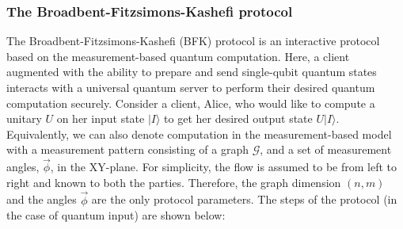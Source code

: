 \subsubsection{The Broadbent-Fitzsimons-Kashefi protocol}
\label{sec:bfk}
The Broadbent-Fitzsimons-Kashefi (BFK) protocol is an interactive protocol based on the measurement-based quantum computation. Here, a client augmented with the ability to prepare and send single-qubit quantum states interacts with a universal quantum server to perform their desired quantum computation securely.  Consider a client, Alice, who would like to compute a unitary $U$ on her input state $|I\rangle$ to get her desired output state $U |I\rangle$.  Equivalently, we can also denote computation in the measurement-based model with a measurement pattern consisting of a graph $\mathcal{G}$, and a set of measurement angles, $\vec \phi$, in the XY-plane. For simplicity, the flow is assumed to be from left to right and known to both the parties. Therefore, the graph dimension $(n,m)$ and the angles $\vec \phi$ are the only protocol parameters. The steps of the protocol (in the case of quantum input) are shown below:
